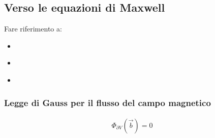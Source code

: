 \documentclass[letterpaper,10pt,italian]{jupyterBook}
\begin{document}
\subsection{Verso le equazioni di Maxwell}
\label{\detokenize{ch/electromagnetism/electromagnetism-steady:verso-le-equazioni-di-maxwell}}\label{\detokenize{ch/electromagnetism/electromagnetism-steady:physics-hs-electromagnetism-electromagnetism-steady-maxwell}}
\sphinxAtStartPar
Fare riferimento a:
\begin{itemize}
\item {} 
\sphinxAtStartPar
{\hyperref[\detokenize{ch/electromagnetism/electrostatics:physics-hs-electromagnetism-electrostatics-maxwell}]{}}

\item {} 
\sphinxAtStartPar
{\hyperref[\detokenize{ch/electromagnetism/electromagnetism-steady:physics-hs-electromagnetism-electromagnetism-steady-maxwell}]{}}

\item {} 
\sphinxAtStartPar
{\hyperref[\detokenize{ch/electromagnetism/electromagnetism-general:physics-hs-electromagnetism-electromagnetism-general-maxwell}]{}}

\end{itemize}


\subsubsection{Legge di Gauss per il flusso del campo magnetico}
\label{\detokenize{ch/electromagnetism/electromagnetism-steady:legge-di-gauss-per-il-flusso-del-campo-magnetico}}\label{\detokenize{ch/electromagnetism/electromagnetism-steady:physics-hs-electromagnetism-electromagnetism-steady-maxwell-gauss-b}}\begin{equation*}
\begin{split}\Phi_{\partial V}(\vec{b}) = 0\end{split}
\end{equation*}
\sphinxAtStartPar
{} 
\end{document}
